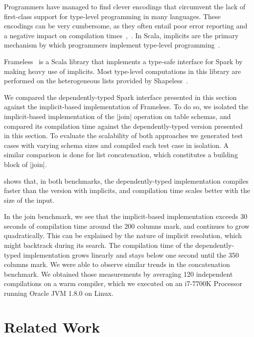 Programmers have managed to find clever encodings that circumvent the lack of first-class support for type-level programming in many languages.
These encodings can be very cumbersome, as they often entail poor error reporting and a negative impact on compilation times~\citep{mcbride2002faking},~\citep{kiselyov2004strongly}.
In Scala, implicits are the primary mechanism by which programmers implement type-level programming~\citep{odersky2018simplicitly}.

Frameless~\citep{blanvillain2016frameless} is a Scala library that implements a type-safe interface for Spark by making heavy use of implicits.
Most type-level computations in this library are performed on the heterogeneous lists provided by Shapeless~\citep{sabin2011shapeless}.

We compared the dependently-typed Spark interface presented in this section against the implicit-based implementation of Frameless.
To do so, we isolated the implicit-based implementation of the |join| operation on table schemas, and compared its compilation time against the dependently-typed version presented in this section.
To evaluate the scalability of both approaches we generated test cases with varying schema sizes and compiled each test case in isolation.
A similar comparison is done for list concatenation, which constitutes a building block of |join|.

 shows that, in both benchmarks, the dependently-typed implementation compiles faster than the version with implicits, and compilation time scales better with the size of the input.

In the join benchmark, we see that the implicit-based implementation exceeds 30 seconds of compilation time around the 200 columns mark, and continues to grow quadratically.
This can be explained by the nature of implicit resolution, which might backtrack during its search.
The compilation time of the dependently-typed implementation grows linearly and stays below one second until the 350 columns mark.
We were able to observe similar trends in the concatenation benchmark.
We obtained those measurements by averaging 120 independent compilations on a warm compiler, which we executed on an i7-7700K Processor running Oracle JVM 1.8.0 on Linux.

\section{Related Work}

